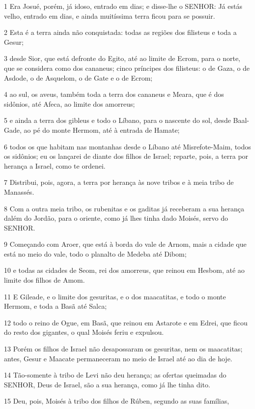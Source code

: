 \par 1 Era Josué, porém, já idoso, entrado em dias; e disse-lhe o SENHOR: Já estás velho, entrado em dias, e ainda muitíssima terra ficou para se possuir.
\par 2 Esta é a terra ainda não conquistada: todas as regiões dos filisteus e toda a Gesur;
\par 3 desde Sior, que está defronte do Egito, até ao limite de Ecrom, para o norte, que se considera como dos cananeus; cinco príncipes dos filisteus: o de Gaza, o de Asdode, o de Asquelom, o de Gate e o de Ecrom;
\par 4 ao sul, os aveus, também toda a terra dos cananeus e Meara, que é dos sidônios, até Afeca, ao limite dos amorreus;
\par 5 e ainda a terra dos gibleus e todo o Líbano, para o nascente do sol, desde Baal-Gade, ao pé do monte Hermom, até à entrada de Hamate;
\par 6 todos os que habitam nas montanhas desde o Líbano até Misrefote-Maim, todos os sidônios; eu os lançarei de diante dos filhos de Israel; reparte, pois, a terra por herança a Israel, como te ordenei.
\par 7 Distribui, pois, agora, a terra por herança às nove tribos e à meia tribo de Manassés.
\par 8 Com a outra meia tribo, os rubenitas e os gaditas já receberam a sua herança dalém do Jordão, para o oriente, como já lhes tinha dado Moisés, servo do SENHOR.
\par 9 Começando com Aroer, que está à borda do vale de Arnom, mais a cidade que está no meio do vale, todo o planalto de Medeba até Dibom;
\par 10 e todas as cidades de Seom, rei dos amorreus, que reinou em Hesbom, até ao limite dos filhos de Amom.
\par 11 E Gileade, e o limite dos gesuritas, e o dos maacatitas, e todo o monte Hermom, e toda a Basã até Salca;
\par 12 todo o reino de Ogue, em Basã, que reinou em Astarote e em Edrei, que ficou do resto dos gigantes, o qual Moisés feriu e expulsou.
\par 13 Porém os filhos de Israel não desapossaram os gesuritas, nem os maacatitas; antes, Gesur e Maacate permaneceram no meio de Israel até ao dia de hoje.
\par 14 Tão-somente à tribo de Levi não deu herança; as ofertas queimadas do SENHOR, Deus de Israel, são a sua herança, como já lhe tinha dito.
\par 15 Deu, pois, Moisés à tribo dos filhos de Rúben, segundo as suas famílias,

